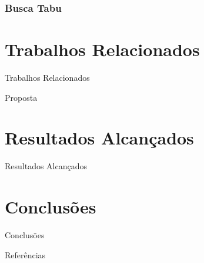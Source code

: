 \documentclass{beamer}
\begin{document}
\begin{frame}
\frametitle{Busca Tabu}
\end{frame}

\section{Trabalhos Relacionados}
\begin{frame}{Trabalhos Relacionados}
\end{frame}

\begin{frame}{Proposta}
\end{frame}

\section{Resultados Alcançados}
\begin{frame}{Resultados Alcançados}
\end{frame}

\section{Conclusões}
\begin{frame}{Conclusões}
\end{frame}


\begin{frame}{Referências}


\end{frame}

\begin{frame}
\maketitle
\end{frame}
\end{document}
